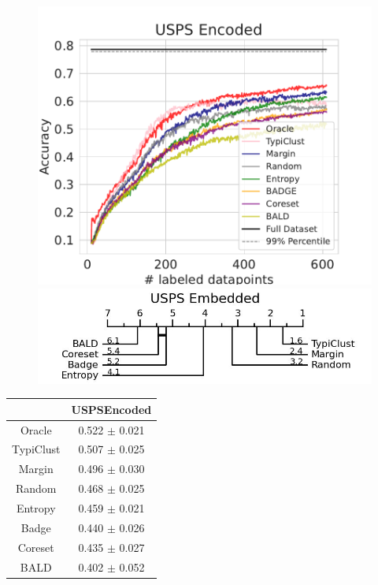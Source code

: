 \documentclass[]{article}
\begin{document}
\begin{minipage}{0.65\linewidth}
\begin{figure}[H]
    \centering
    \includegraphics[width=\linewidth]{img/eval_usps_enc}\\ [2mm]
    \includegraphics[width=\linewidth]{img/micro_usps_enc.jpg} 
\end{figure}
\end{minipage}
\begin{minipage}{0.29\linewidth}
\begin{tabular}{c|c}
&USPSEncoded\\
\hline
Oracle&0.522 $\pm$ 0.021\\
TypiClust&0.507 $\pm$ 0.025\\
Margin&0.496 $\pm$ 0.030\\
Random&0.468 $\pm$ 0.025\\
Entropy&0.459 $\pm$ 0.021\\
Badge&0.440 $\pm$ 0.026\\
Coreset&0.435 $\pm$ 0.027\\
BALD&0.402 $\pm$ 0.052\\
\end{tabular}
\end{minipage}
\end{document}
